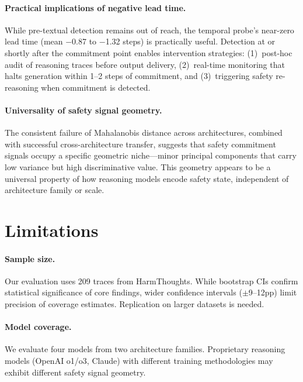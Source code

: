 \documentclass[11pt,a4paper]{article}
\begin{document}
\paragraph{Practical implications of negative lead time.}
While pre-textual detection remains out of reach, the temporal probe's near-zero lead time (mean $-$0.87 to $-$1.32 steps) is practically useful.
Detection at or shortly after the commitment point enables intervention strategies: (1)~post-hoc audit of reasoning traces before output delivery, (2)~real-time monitoring that halts generation within 1--2 steps of commitment, and (3)~triggering safety re-reasoning when commitment is detected.

\paragraph{Universality of safety signal geometry.}
The consistent failure of Mahalanobis distance across architectures, combined with successful cross-architecture transfer, suggests that safety commitment signals occupy a specific geometric niche---minor principal components that carry low variance but high discriminative value.
This geometry appears to be a universal property of how reasoning models encode safety state, independent of architecture family or scale.

\section{Limitations}

\paragraph{Sample size.} Our evaluation uses 209 traces from HarmThoughts.  While bootstrap CIs confirm statistical significance of core findings, wider confidence intervals ($\pm$9--12pp) limit precision of coverage estimates.  Replication on larger datasets is needed.

\paragraph{Model coverage.} We evaluate four models from two architecture families.  Proprietary reasoning models (OpenAI o1/o3, Claude) with different training methodologies may exhibit different safety signal geometry.
\end{document}
